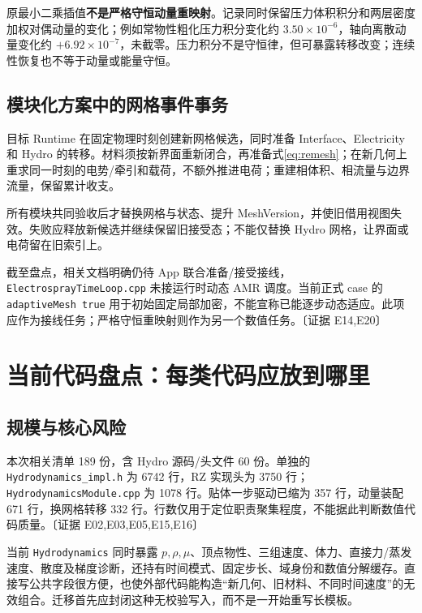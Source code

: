 \documentclass[UTF8,a4paper,11pt,fontset=fandol]{ctexart}
\newcommand{\code}[1]{\nolinkurl{#1}}
\newcommand{\ev}[1]{{\small\color{muted}〔证据 #1〕}}
\begin{document}
原最小二乘插值\textbf{不是严格守恒动量重映射}。记录同时保留压力体积积分和两层密度加权对偶动量的变化；例如常物性粗化压力积分变化约 $3.50\times10^{-6}$，轴向离散动量变化约 $+6.92\times10^{-7}$，未截零。压力积分不是守恒律，但可暴露转移改变；连续性恢复也不等于动量或能量守恒。

\subsection{模块化方案中的网格事件事务}
目标 Runtime 在固定物理时刻创建新网格候选，同时准备 Interface、Electricity 和 Hydro 的转移。材料须按新界面重新闭合，再准备式\eqref{eq:remesh}；在新几何上重求同一时刻的电势/牵引和载荷，不额外推进电荷；重建相体积、相流量与边界流量，保留累计收支。

所有模块共同验收后才替换网格与状态、提升 MeshVersion，并使旧借用视图失效。失败应释放新候选并继续保留旧接受态；不能仅替换 Hydro 网格，让界面或电荷留在旧索引上。

截至盘点，相关文档明确仍待 App 联合准备/接受接线，\code{ElectrosprayTimeLoop.cpp} 未接运行时动态 AMR 调度。当前正式 case 的 \code{adaptiveMesh true} 用于初始固定局部加密，不能宣称已能逐步动态适应。此项应作为接线任务；严格守恒重映射则作为另一个数值任务。\ev{E14,E20}

\section{当前代码盘点：每类代码应放到哪里}
\subsection{规模与核心风险}
本次相关清单 189 份，含 Hydro 源码/头文件 60 份。单独的 \code{Hydrodynamics_impl.h} 为 6742 行，RZ 实现头为 3750 行；\code{HydrodynamicsModule.cpp} 为 1078 行。贴体一步驱动已缩为 357 行，动量装配 671 行，换网格转移 332 行。行数仅用于定位职责聚集程度，不能据此判断数值代码质量。\ev{E02,E03,E05,E15,E16}

当前 \code{Hydrodynamics} 同时暴露 $p,\rho,\mu$、顶点物性、三组速度、体力、直接力/蒸发速度、散度及梯度诊断，还持有时间模式、固定步长、域身份和数值分解缓存。直接写公共字段很方便，也使外部代码能构造“新几何、旧材料、不同时间速度”的无效组合。迁移首先应封闭这种无校验写入，而不是一开始重写长模板。
\end{document}
